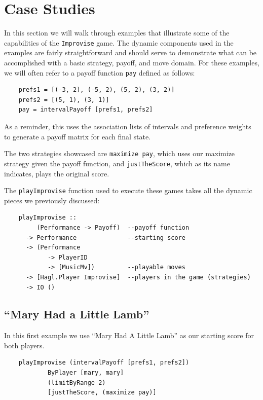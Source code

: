 \documentclass{article}
\begin{document}
\section{Case Studies}

In this section we will walk through examples that illustrate some of
the capabilities of the \texttt{Improvise} game. The dynamic components used in
the examples are fairly straightforward and should serve to demonstrate
what can be accomplished with a basic strategy, payoff, and move domain.
For these examples, we will often refer to a payoff function
\texttt{pay} defined as follows:

\begin{verbatim}
    prefs1 = [(-3, 2), (-5, 2), (5, 2), (3, 2)]
    prefs2 = [(5, 1), (3, 1)]
    pay = intervalPayoff [prefs1, prefs2]
\end{verbatim}

As a reminder, this uses the association lists of intervals and preference
weights to generate a payoff matrix for each final state.

The two strategies showcased are \texttt{maximize pay}, which uses
our maximize strategy given the payoff function, and
\texttt{justTheScore}, which as its name indicates, plays the original
score.

The \texttt{playImprovise} function used to execute these games takes
all the dynamic pieces we previously discussed:

\begin{verbatim}
    playImprovise :: 
         (Performance -> Payoff)  --payoff function
      -> Performance              --starting score
      -> (Performance 
            -> PlayerID 
            -> [MusicMv])         --playable moves
      -> [Hagl.Player Improvise]  --players in the game (strategies)
      -> IO ()
\end{verbatim}

\subsection{``Mary Had a Little Lamb''}

In this first example we use ``Mary Had A Little Lamb'' as our starting
score for both players.

\begin{verbatim}
    playImprovise (intervalPayoff [prefs1, prefs2])
            ByPlayer [mary, mary]
            (limitByRange 2)
            [justTheScore, (maximize pay)]
\end{verbatim}
\end{document}
